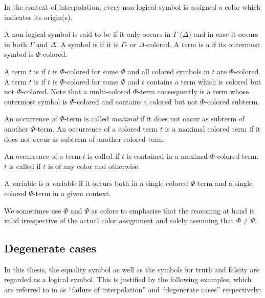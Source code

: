 In the context of interpolation, every non-logical symbol is assigned a color which indicates its origin(s). 
\begin{defi}[Coloring]
	\label{def:coloring}
A non-logical symbol is said to be  if it only occurs in $\Gamma$ ($\Delta$) and  in case it occurs in both $\Gamma$ and $\Delta$. A symbol is  if it is $\Gamma$- or $\Delta$-colored.
A term is a  if its outermost symbol is $\Phi$-colored.

A term $t$ is  if $t$ is $\Phi$-colored for some $\Phi$ and all colored symbols in $t$ are $\Phi$-colored.
A term $t$ is  if $t$ is $\Phi$-colored for some $\Phi$ and $t$ contains a term which is colored but not $\Phi$-colored.
Note that a multi-colored $\Phi$-term consequently is a term whose outermost symbol is $\Phi$-colored and contains a colored but not $\Phi$-colored subterm.

An occurrence of $\Phi$-term is called \emph{maximal} if it does not occur as subterm of another $\Phi$-term.
An occurrence of a colored term $t$ is a maximal colored term if it does not occur as subterm of another colored term.

  An occurrence of a term $t$ is called  if $t$ is contained in a maximal $\Phi$-colored term.
	$t$ is called  if $t$ is of any color and  otherwise.

	A variable is a  variable if it occurs both in a single-colored $\Phi$-term and a single-colored $\Psi$-term in a given context.
\end{defi}

We sometimes use $\Phi$ and $\Psi$ as colors to emphasise that the reasoning at hand is valid irrespective of the actual color assignment and solely assuming that $\Phi \neq \Psi$. 


\subsection{Degenerate cases}
In this thesis, the equality symbol as well as the symbols for truth and falsity are regarded as a logical symbol. 
This is justified by the following examples, which are referred to in \cite[Example 20.2 and 20.4]{boolos2007computability} as ``failure of interpolation'' and ``degenerate cases'' respectively:

